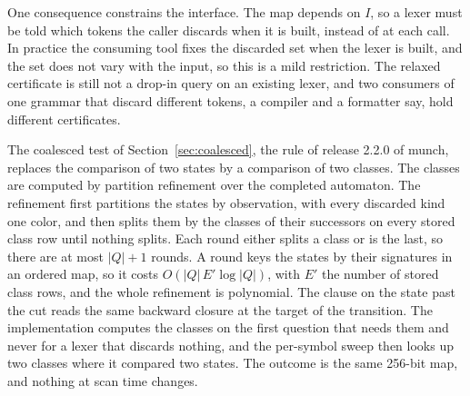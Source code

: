 \documentclass[11pt,a4paper]{article}
\theoremstyle{definition}
\theoremstyle{plain}
\begin{document}
One consequence constrains the interface. The map depends on $I$, so a lexer must be told which tokens the caller
discards when it is built, instead of at each call. In practice the consuming tool fixes the discarded set when the
lexer is built, and the set does not vary with the input, so this is a mild restriction. The relaxed certificate is
still not a drop-in query on an existing lexer, and two consumers of one grammar that discard different tokens, a
compiler and a formatter say, hold different certificates.

The coalesced test of Section~\ref{sec:coalesced}, the rule of release 2.2.0 of munch, replaces the comparison of two
states by a comparison of two classes. The classes are computed by partition refinement over the completed automaton.
The refinement first partitions the states by observation, with every discarded kind one color, and then splits them by
the classes of their successors on every stored class row until nothing splits. Each round either splits a class or is
the last, so there are at most $|Q| + 1$ rounds. A round keys the states by their signatures in an ordered map, so it
costs $O(|Q|\,E' \log |Q|)$, with $E'$ the number of stored class rows, and the whole refinement is polynomial. The
clause on the state past the cut reads the same backward closure at the target of the transition. The implementation
computes the classes on the first question that needs them and never for a lexer that discards nothing, and the
per-symbol sweep then looks up two classes where it compared two states. The outcome is the same 256-bit map, and
nothing at scan time changes.
\end{document}
